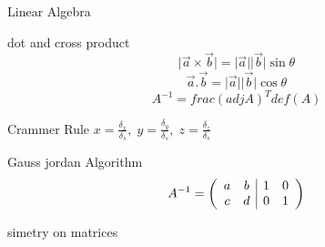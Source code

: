 \begin{section}{Linear Algebra}
	\begin{subsection}{dot and cross product}
	$$\vert \vec{a} \times \vec{b} \vert = \vert \vec{a} \vert \vert \vec{b} \vert  \sin \theta$$
	$$ \vec{a} . \vec{b}  = \vert \vec{a} \vert \vert \vec{b} \vert  \cos \theta$$
	$$A^{-1} = frac{(adj{A})^{T}}{def(A)}$$
	
	\end{subsection}
	\begin{subsection}{Crammer Rule}
		$x = \frac{\delta_x}{\delta_s},\;y = \frac{\delta_y}{\delta_s},\;z = \frac{\delta_z}{\delta_s}$

	\end{subsection}
	\begin{subsection}{Gauss jordan Algorithm}
		$$A^{-1} =
		\left(
		\begin{array}{c c |c c}
			a & b & 1 & 0 \\
			c & d & 0 & 1
		\end{array}
		\right)
		$$

	\end{subsection}
	\begin{subsection}{simetry on matrices}
		
	\end{subsection}

\end{section}

